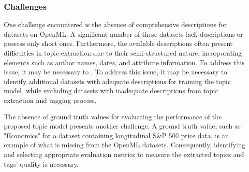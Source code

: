 \documentclass{article}
\begin{document}
\subsubsection{Challenges}
One challenge encountered is the absence of comprehensive descriptions for datasets on OpenML. A significant number of these datasets lack descriptions or possess only short ones. Furthermore, the available descriptions often present difficulties in topic extraction due to their semi-structured nature, incorporating elements such as author names, dates, and attribute information. To address this issue, it may be necessary to . To address this issue, it may be necessary to identify additional datasets with adequate descriptions for training the topic model, while excluding datasets with inadequate descriptions from topic extraction and tagging process.

The absence of ground truth values for evaluating the performance of the proposed topic model presents another challenge. A ground truth value, such as "Economics" for a dataset containing longitudinal S\&P 500 price data, is an example of what is missing from the OpenML datasets. Consequently, identifying and selecting appropriate evaluation metrics to measure the extracted topics and tags' quality is necessary.






\end{document}
